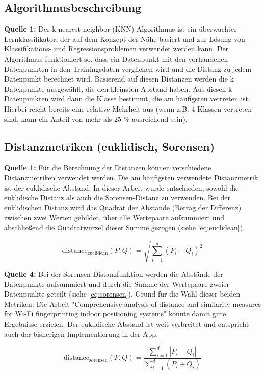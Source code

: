 \subsection{Algorithmusbeschreibung}
\textbf{Quelle 1:} Der k-nearest neighbor (KNN) Algorithmus ist ein überwachter Lernklassifikator, der auf dem Konzept der Nähe basiert und zur Lösung von Klassifikations- und Regressionsproblemen verwendet werden kann. Der Algorithmus funktioniert so, dass ein Datenpunkt mit den vorhandenen Datenpunkten in den Trainingsdaten verglichen wird und die Distanz zu jedem Datenpunkt berechnet wird. Basierend auf diesen Distanzen werden die k Datenpunkte ausgewählt, die den kleinsten Abstand haben. Aus diesen k Datenpunkten wird dann die Klasse bestimmt, die am häufigsten vertreten ist. Hierbei reicht bereits eine relative Mehrheit aus (wenn z.B. 4 Klassen vertreten sind, kann ein Anteil von mehr als 25 \% ausreichend sein).

\subsection{Distanzmetriken (euklidisch, Sorensen)}
\textbf{Quelle 1:} Für die Berechnung der Distanzen können verschiedene Distanzmetriken verwendet werden. Die am häufigsten verwendete Distanzmetrik ist der euklidische Abstand. In dieser Arbeit wurde entschieden, sowohl die euklidische Distanz als auch die Sorensen-Distanz zu verwenden. Bei der euklidischen Distanz wird das Quadrat der Abstände (Betrag der Differenz) zwischen zwei Werten gebildet, über alle Wertepaare aufsummiert und abschließend die Quadratwurzel dieser Summe gezogen (siehe \ref{eq:euclidean}).

\begin{equation}
    \label{eq:euclidean}
    \text{distance}_{\text{euclidean}}(P, Q) = \sqrt{\sum_{i=1}^{d} (P_i - Q_i)^2}
\end{equation}

\textbf{Quelle 4:} Bei der Sorensen-Distanzfunktion werden die Abstände der Datenpunkte aufsummiert und durch die Summe der Wertepaare zweier Datenpunkte geteilt (siehe \ref{eq:sorensen}). Grund für die Wahl dieser beiden Metriken: Die Arbeit "Comprehensive analysis of distance and similarity measures for Wi-Fi fingerprinting indoor positioning systems" konnte damit gute Ergebnisse erzielen. Der euklidische Abstand ist weit verbreitet und entspricht auch der bisherigen Implementierung in der App.

\begin{equation}
    \label{eq:sorensen}
    \text{distance}_{\text{sorensen}}(P, Q) = \frac{\sum_{i=1}^{d} |P_i - Q_i|}{\sum_{i=1}^{d} (P_i + Q_i)}
\end{equation}

